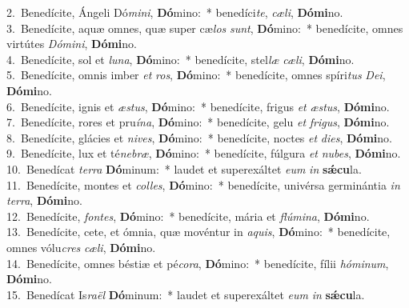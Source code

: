 {2.~}Benedícite, Ángeli Dó\textit{mi}\textit{ni}, \textbf{Dó}mino:~* benedíci\textit{te}, \textit{cæ}\textit{li}, \textbf{Dó}\textbf{mi}no.\\
{3.~}Benedícite, aquæ omnes, quæ super cæ\textit{los} \textit{sunt}, \textbf{Dó}mino:~* benedícite, omnes virtútes \textit{Dó}\textit{mi}\textit{ni}, \textbf{Dó}\textbf{mi}no.\\
{4.~}Benedícite, sol et \textit{lu}\textit{na}, \textbf{Dó}mino:~* benedícite, stel\textit{læ} \textit{cæ}\textit{li}, \textbf{Dó}\textbf{mi}no.\\
{5.~}Benedícite, omnis imber \textit{et} \textit{ros}, \textbf{Dó}mino:~* benedícite, omnes spíri\textit{tus} \textit{De}\textit{i}, \textbf{Dó}\textbf{mi}no.\\
{6.~}Benedícite, ignis et \textit{æ}\textit{stus}, \textbf{Dó}mino:~* benedícite, frigus \textit{et} \textit{æ}\textit{stus}, \textbf{Dó}\textbf{mi}no.\\
{7.~}Benedícite, rores et pru\textit{í}\textit{na}, \textbf{Dó}mino:~* benedícite, gelu \textit{et} \textit{fri}\textit{gus}, \textbf{Dó}\textbf{mi}no.\\
{8.~}Benedícite, glácies et \textit{ni}\textit{ves}, \textbf{Dó}mino:~* benedícite, noctes \textit{et} \textit{di}\textit{es}, \textbf{Dó}\textbf{mi}no.\\
{9.~}Benedícite, lux et té\textit{ne}\textit{bræ}, \textbf{Dó}mino:~* benedícite, fúlgura \textit{et} \textit{nu}\textit{bes}, \textbf{Dó}\textbf{mi}no.\\
{10.~}Benedícat \textit{ter}\textit{ra} \textbf{Dó}minum:~* laudet et superexáltet \textit{e}\textit{um} \textit{in} \textbf{sǽ}\textbf{cu}la.\\
{11.~}Benedícite, montes et \textit{col}\textit{les}, \textbf{Dó}mino:~* benedícite, univérsa germinántia \textit{in} \textit{ter}\textit{ra}, \textbf{Dó}\textbf{mi}no.\\
{12.~}Benedícite, \textit{fon}\textit{tes}, \textbf{Dó}mino:~* benedícite, mária et \textit{flú}\textit{mi}\textit{na}, \textbf{Dó}\textbf{mi}no.\\
{13.~}Benedícite, cete, et ómnia, quæ movéntur in \textit{a}\textit{quis}, \textbf{Dó}mino:~* benedícite, omnes vólu\textit{cres} \textit{cæ}\textit{li}, \textbf{Dó}\textbf{mi}no.\\
{14.~}Benedícite, omnes béstiæ et pé\textit{co}\textit{ra}, \textbf{Dó}mino:~* benedícite, fílii \textit{hó}\textit{mi}\textit{num}, \textbf{Dó}\textbf{mi}no.\\
{15.~}Benedícat Is\textit{ra}\textit{ël} \textbf{Dó}minum:~* laudet et superexáltet \textit{e}\textit{um} \textit{in} \textbf{sǽ}\textbf{cu}la.\\
